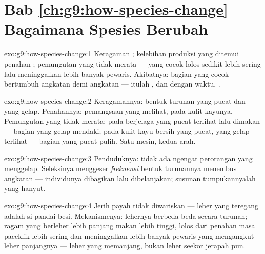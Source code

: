 \section*{Bab \ref{ch:g9:how-species-change} --- Bagaimana Spesies Berubah}

\begin{solution}{exo:g9:how-species-change:1}
Keragaman ; kelebihan produksi yang ditemui
penahan ; pemungutan yang tidak merata --- yang
cocok lolos sedikit lebih sering lalu meninggalkan lebih
banyak pewaris. Akibatnya: bagian  yang cocok bertumbuh
angkatan demi angkatan --- itulah , dan dengan
waktu, .
\end{solution}

\begin{solution}{exo:g9:how-species-change:2}
Keragamannya: bentuk turunan yang pucat dan yang gelap.
Penahannya: pemangsaan  yang melihat, pada kulit
kayunya. Pemungutan yang tidak merata: pada  berjelaga
yang pucat terlihat lalu dimakan --- bagian yang gelap
mendaki; pada kulit kayu bersih yang pucat, yang gelap
terlihat --- bagian yang pucat pulih. Satu mesin, kedua arah.
\end{solution}

\begin{solution}{exo:g9:how-species-change:3}
Penduduknya: tidak ada ngengat perorangan yang menggelap.
Seleksinya menggeser \emph{frekuensi} bentuk turunannya
menembus angkatan --- individunya dibagikan lalu
dibelanjakan; susunan tumpukannyalah yang hanyut.
\end{solution}

\begin{solution}{exo:g9:how-species-change:4}
Jerih payah tidak diwariskan --- leher yang teregang adalah
 si pandai besi. Mekanismenya: lehernya berbeda-beda
secara turunan; ragam yang berleher lebih panjang makan
lebih tinggi, lolos dari penahan masa paceklik lebih sering
dan meninggalkan lebih banyak pewaris yang mengangkut 
leher panjangnya --- leher  yang memanjang,
bukan leher seekor jerapah pun.
\end{solution}

